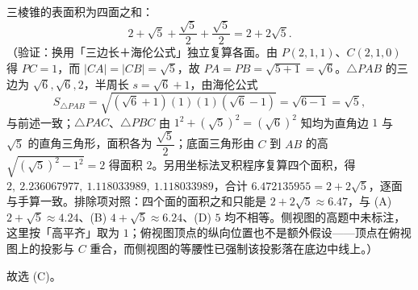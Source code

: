 \begin{answer}
三棱锥的表面积为四面之和：
\nopagebreak[4]
\[
2+\sqrt{5}+\frac{\sqrt{5}}{2}+\frac{\sqrt{5}}{2}=2+2\sqrt{5}.
\]
（验证：换用「三边长＋海伦公式」独立复算各面。由 \(P(2,1,1)\)、\(C(2,1,0)\) 得 \(PC=1\)，而 \(|CA|=|CB|=\sqrt{5}\)，故 \(PA=PB=\sqrt{5+1}=\sqrt{6}\)。\(\triangle PAB\) 的三边为 \(\sqrt{6},\sqrt{6},2\)，半周长 \(s=\sqrt{6}+1\)，由海伦公式
\nopagebreak[4]
\[
S_{\triangle PAB}=\sqrt{(\sqrt{6}+1)(1)(1)(\sqrt{6}-1)}=\sqrt{6-1}=\sqrt{5},
\]
与前述一致；\(\triangle PAC\)、\(\triangle PBC\) 由 \(1^{2}+(\sqrt{5})^{2}=(\sqrt{6})^{2}\) 知均为直角边 \(1\) 与 \(\sqrt{5}\) 的直角三角形，面积各为 \(\dfrac{\sqrt{5}}{2}\)；底面三角形由 \(C\) 到 \(AB\) 的高 \(\sqrt{(\sqrt{5})^{2}-1^{2}}=2\) 得面积 \(2\)。另用坐标法叉积程序复算四个面积，得 \(2,\ 2.236067977,\ 1.118033989,\ 1.118033989\)，合计 \(6.472135955=2+2\sqrt{5}\)，逐面与手算一致。排除项对照：四个面的面积之和只能是 \(2+2\sqrt{5}\approx6.47\)，与 (A) \(2+\sqrt{5}\approx4.24\)、(B) \(4+\sqrt{5}\approx6.24\)、(D) \(5\) 均不相等。侧视图的高题中未标注，这里按「高平齐」取为 \(1\)；俯视图顶点的纵向位置也不是额外假设——顶点在俯视图上的投影与 \(C\) 重合，而侧视图的等腰性已强制该投影落在底边中线上。）

故选 (C)。


\end{answer}
